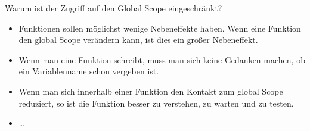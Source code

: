 \begin{frame}
	
\begin{block}{Warum ist der Zugriff auf den Global Scope eingeschränkt?}
	\pause 
	\begin{itemize}[<+->]
		\item Funktionen sollen möglichst wenige Nebeneffekte haben. Wenn eine Funktion den global Scope verändern kann, ist dies ein großer Nebeneffekt. 
		\item Wenn man eine Funktion schreibt, muss man sich keine Gedanken machen, ob ein Variablenname schon vergeben ist. 
		\item Wenn man sich innerhalb einer Funktion den Kontakt zum global Scope reduziert, so ist die Funktion besser zu verstehen, zu warten und zu testen. 
		\item \dots
	\end{itemize}
\end{block}
	
	
\end{frame}



























































